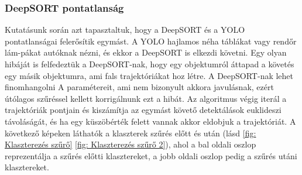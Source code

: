 \documentclass[acmtog, authorversion]{acmart}
\begin{document}
\subsubsection{DeepSORT pontatlanság}
Kutatásunk során azt tapasztaltuk, hogy a DeepSORT és a YOLO pontatlanságai felerősítik egymást. A YOLO hajlamos néha táblákat
vagy rendőr lám-pákat autóknak nézni, és ekkor a DeepSORT is elkezdi követni. Egy olyan hibáját is felfedeztük a DeepSORT-nak, hogy
egy objektumról áttapad a követés egy másik objektumra, ami fals trajektóriákat hoz létre. A DeepSORT-nak lehet finomhangolni A
paramétereit, ami nem bizonyult akkora javulásnak, ezért útólagos szűréssel kellett korrigálnunk ezt a hibát. Az algoritmus végig 
iterál a trajektóriák pontjain és kiszámítja az egymást követő detektálások euklideszi távoláságát, és ha egy küszöbérték felett vannak akkor eldobjuk a trajektóriát.
A következő képeken láthatók a klaszterek szűrés előtt és után (lásd \ref{fig: Klaszterezés szűrő} \ref{fig: Klaszterezés szűrő 2}), ahol a bal oldali oszlop reprezentálja a szűrés előtti klasztereket, a jobb oldali oszlop pedig a szűrés utáni klasztereket.
\end{document}

